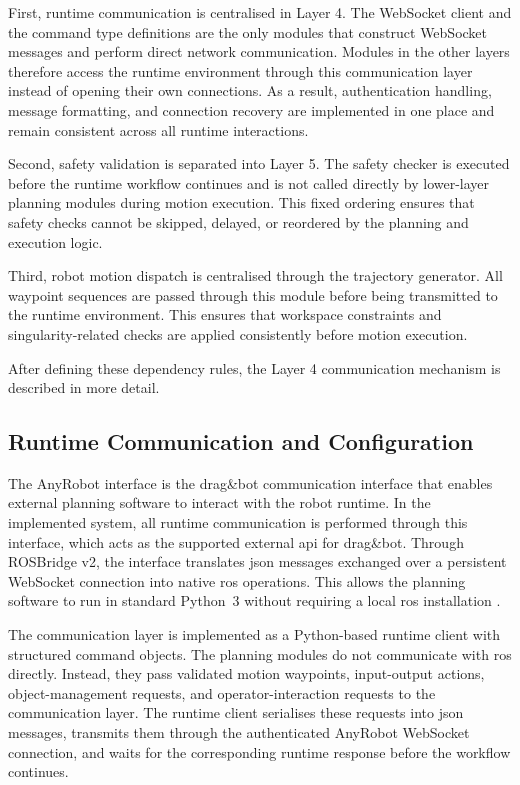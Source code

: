 First, runtime communication is centralised in Layer 4. The WebSocket client and the command type definitions are the only modules that construct WebSocket messages and perform direct network communication. Modules in the other layers therefore access the runtime environment through this communication layer instead of opening their own connections. As a result, authentication handling, message formatting, and connection recovery are implemented in one place and remain consistent across all runtime interactions.

Second, safety validation is separated into Layer 5. The safety checker is executed before the runtime workflow continues and is not called directly by lower-layer planning modules during motion execution. This fixed ordering ensures that safety checks cannot be skipped, delayed, or reordered by the planning and execution logic.

Third, robot motion dispatch is centralised through the trajectory generator. All waypoint sequences are passed through this module before being transmitted to the runtime environment. This ensures that workspace constraints and singularity-related checks are applied consistently before motion execution.

After defining these dependency rules, the Layer 4 communication mechanism is described in more detail.

\subsection{Runtime Communication and Configuration}
\label{sec:runtime-communication-anyrobot}

The AnyRobot interface is the drag\&bot communication interface that enables external planning software to interact with the robot runtime. In the implemented system, all runtime communication is performed through this interface, which acts as the supported external \ac{api} for drag\&bot. Through ROSBridge v2, the interface translates \ac{json} messages exchanged over a persistent WebSocket connection into native \ac{ros} operations. This allows the planning software to run in standard Python~3 without requiring a local \ac{ros} installation \cite{dragandbot_anyrobot_2025}.

The communication layer is implemented as a Python-based runtime client with structured command objects. The planning modules do not communicate with \ac{ros} directly. Instead, they pass validated motion waypoints, input-output actions, object-management requests, and operator-interaction requests to the communication layer. The runtime client serialises these requests into \ac{json} messages, transmits them through the authenticated AnyRobot WebSocket connection, and waits for the corresponding runtime response before the workflow continues.


